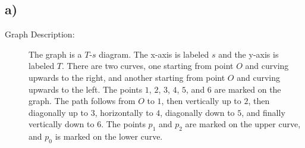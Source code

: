 

\subsection*{a)}

\begin{description}
    \item[Graph Description:] The graph is a $T$-$s$ diagram. The x-axis is labeled $s$ and the y-axis is labeled $T$. There are two curves, one starting from point $O$ and curving upwards to the right, and another starting from point $O$ and curving upwards to the left. The points $1$, $2$, $3$, $4$, $5$, and $6$ are marked on the graph. The path follows from $O$ to $1$, then vertically up to $2$, then diagonally up to $3$, horizontally to $4$, diagonally down to $5$, and finally vertically down to $6$. The points $p_1$ and $p_2$ are marked on the upper curve, and $p_0$ is marked on the lower curve.
\end{description}